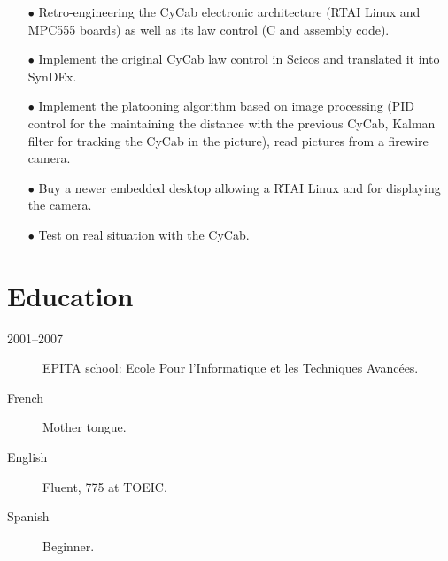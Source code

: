 \documentclass{crcv}
\begin{document}
\begin{itemize}
\item[$\bullet$] Retro-engineering the CyCab electronic architecture
  (RTAI Linux and MPC555 boards) as well as its law control (C and
  assembly code).
\item[$\bullet$] Implement the original CyCab law control in Scicos
  and translated it into SynDEx.
\item[$\bullet$] Implement the platooning algorithm based on image
  processing (PID control for the maintaining the distance with the
  previous CyCab, Kalman filter for tracking the CyCab in the
  picture), read pictures from a firewire camera.
\item[$\bullet$] Buy a newer embedded desktop allowing a RTAI Linux
  and for displaying the camera.
\item[$\bullet$] Test on real situation with the CyCab.
\end{itemize}

\section{\textcolor{fortitle}{Edu}cation}
\begin{description}
\item[\textcolor{fortitle}{2001--2007}] EPITA school: Ecole Pour l'Informatique et les Techniques Avanc\'ees.
\end{description}

\begin{description}
\item[\textcolor{fortitle}{French}] Mother tongue.
\item[\textcolor{fortitle}{English}] Fluent, 775 at TOEIC.
\item[\textcolor{fortitle}{Spanish}] Beginner.
\end{description}

\end{document}
